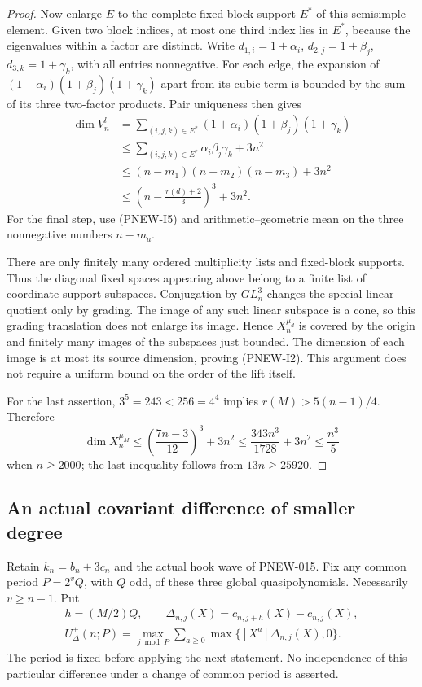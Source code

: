 \begin{proof}
Now enlarge $E$ to the complete fixed-block support $E^*$ of this
semisimple element. Given two block indices, at most one third
index lies in $E^*$, because the eigenvalues within a factor are
distinct. Write $d_{1,i}=1+\alpha_i$, $d_{2,j}=1+\beta_j$,
$d_{3,k}=1+\gamma_k$, with all entries nonnegative. For each edge,
the expansion of $(1+\alpha_i)(1+\beta_j)(1+\gamma_k)$ apart from
its cubic term is bounded by the sum of its three two-factor
products. Pair uniqueness then gives
\[
\begin{split}
 \dim V_n^l
 &=\sum_{(i,j,k)\in E^*}
        (1+\alpha_i)(1+\beta_j)(1+\gamma_k)\\
 &\le \sum_{(i,j,k)\in E^*}\alpha_i\beta_j\gamma_k+3n^2\\
 &\le (n-m_1)(n-m_2)(n-m_3)+3n^2\\
 &\le\left(n-\frac{r(d)+2}{3}\right)^3+3n^2.
\end{split}                                             \tag{PNEW-I6}
\]
For the final step, use (PNEW-I5) and arithmetic--geometric mean
on the three nonnegative numbers $n-m_a$.

There are only finitely many ordered multiplicity lists and
fixed-block supports. Thus the diagonal fixed spaces appearing
above belong to a finite list of coordinate-support subspaces.
Conjugation by $GL_n^3$ changes the special-linear quotient only
by grading. The image of any such linear subspace is a cone,
so this grading translation does not enlarge its image. Hence
$X_n^{\mu_d}$ is covered by the origin and finitely many images
of the subspaces just bounded. The dimension of each image is at
most its source dimension, proving (PNEW-I2). This argument does
not require a uniform bound on the order of the lift itself.

For the last assertion, $3^5=243<256=4^4$ implies
$r(M)>5(n-1)/4$. Therefore
\[
 \dim X_n^{\mu_M}
 \le\left(\frac{7n-3}{12}\right)^3+3n^2
 \le\frac{343n^3}{1728}+3n^2\le\frac{n^3}{5}
                                                        \tag{PNEW-I7}
\]
when $n\ge2000$; the last inequality follows from
$13n\ge25920$.
\end{proof}

\subsection*{An actual covariant difference of smaller degree}

Retain $k_n=b_n+3c_n$ and the actual hook wave of PNEW-015.
Fix any common period $P=2^vQ$, with $Q$ odd, of these three
global quasipolynomials. Necessarily $v\ge n-1$. Put
\[
\begin{gathered}
 h=(M/2)Q,\qquad
 \Delta_{n,j}(X)=c_{n,j+h}(X)-c_{n,j}(X),\\
 U_{\Delta}^+(n;P)=\max_{j\bmod P}\sum_{a\ge0}
                   \max\{[X^a]\Delta_{n,j}(X),0\}.
\end{gathered}
                                                        \tag{PNEW-I8}
\]
The period is fixed before applying the next statement. No independence
of this particular difference under a change of common period is
asserted.

